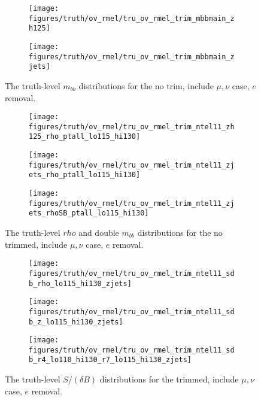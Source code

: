 \begin{figure}[!htbp]\captionsetup{justification=centering}
\begin{center}
\begin{subfigure}[t]{18pc}\centering\texttt{[image: figures/truth/ov\_rmel/tru\_ov\_rmel\_trim\_mbbmain\_zh125]}\caption{}\end{subfigure}
\begin{subfigure}[t]{18pc}\centering\texttt{[image: figures/truth/ov\_rmel/tru\_ov\_rmel\_trim\_mbbmain\_zjets]}\caption{}\end{subfigure}
\caption{\label{fig:mbbtrim}The truth-level $m_{bb}$ distributions for the no trim, include $\mu,\nu$ case, $e$ removal.}
\end{center}
\end{figure}
\begin{figure}[!htbp]\captionsetup{justification=centering}
\begin{center}
\begin{subfigure}[t]{18pc}\centering\texttt{[image: figures/truth/ov\_rmel/tru\_ov\_rmel\_trim\_ntel11\_zh125\_rho\_ptall\_lo115\_hi130]}\caption{}\end{subfigure}
\begin{subfigure}[t]{18pc}\centering\texttt{[image: figures/truth/ov\_rmel/tru\_ov\_rmel\_trim\_ntel11\_zjets\_rho\_ptall\_lo115\_hi130]}\caption{}\end{subfigure}
\begin{subfigure}[t]{18pc}\centering\texttt{[image: figures/truth/ov\_rmel/tru\_ov\_rmel\_trim\_ntel11\_zjets\_rhoSB\_ptall\_lo115\_hi130]}\caption{}\end{subfigure}
\caption{\label{fig:mbbtrim}The truth-level $rho$ and double $m_{bb}$ distributions for the no trimmed, include $\mu,\nu$ case, $e$ removal.}
\end{center}
\end{figure}
\begin{figure}[!htbp]\captionsetup{justification=centering}
\begin{center}
\begin{subfigure}[t]{18pc}\centering\texttt{[image: figures/truth/ov\_rmel/tru\_ov\_rmel\_trim\_ntel11\_sdb\_rho\_lo115\_hi130\_zjets]}\caption{}\end{subfigure}
\begin{subfigure}[t]{18pc}\centering\texttt{[image: figures/truth/ov\_rmel/tru\_ov\_rmel\_trim\_ntel11\_sdb\_z\_lo115\_hi130\_zjets]}\caption{}\end{subfigure}
\begin{subfigure}[t]{18pc}\centering\texttt{[image: figures/truth/ov\_rmel/tru\_ov\_rmel\_trim\_ntel11\_sdb\_r4\_lo110\_hi130\_r7\_lo115\_hi130\_zjets]}\caption{}\end{subfigure}
\caption{\label{fig:mbbtrim}The truth-level $S/(\delta B)$ distributions for the trimmed, include $\mu,\nu$ case, $e$ removal.}
\end{center}
\end{figure}

